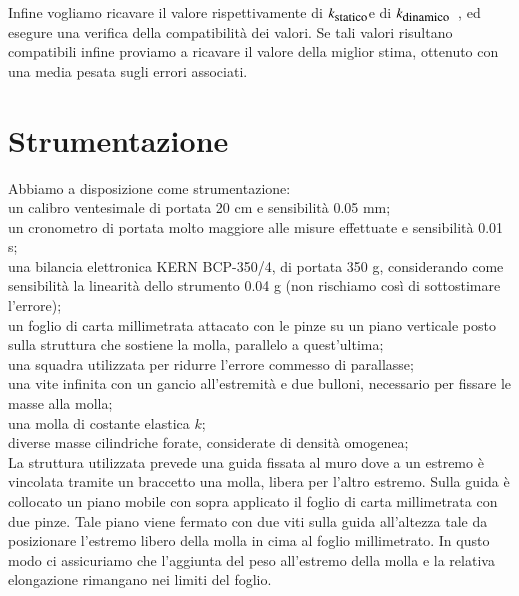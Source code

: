 \documentclass[italian, a4paper, 10pt, twocolumn]{../../style/lab_unige}
\newcommand{\ks}{$k_{\text{\small statico}}$\space}
\newcommand{\kd}{$k_{\text{\small dinamico}}$\space}
\begin{document}
    Infine vogliamo ricavare il valore rispettivamente di \ks e di \kd~, ed
    esegure una verifica della compatibilità dei valori. Se tali valori risultano compatibili infine proviamo a 
    ricavare il valore della miglior stima, ottenuto con una media pesata sugli errori associati.

    \section{Strumentazione}
    \label{section:strument}
    Abbiamo a disposizione come strumentazione:\\
    un calibro ventesimale di portata 20 cm e sensibilità 0.05 mm;\\
    un cronometro di portata molto maggiore alle misure effettuate e sensibilità 0.01 s;\\
    una bilancia elettronica KERN BCP-350/4, di portata 350 g, considerando come sensibilità la linearità dello 
    strumento 0.04 g (non rischiamo così di sottostimare l'errore);\\
    un foglio di carta millimetrata attacato con le pinze su un piano verticale posto sulla struttura che sostiene
    la molla, parallelo a quest'ultima;\\
    una squadra utilizzata per ridurre l'errore commesso di parallasse;\\
    una vite infinita con un gancio all'estremità e due bulloni, necessario per fissare le masse alla molla;\\
    una molla di costante elastica $k$;\\
    diverse masse cilindriche forate, considerate di densità omogenea;\\

    La struttura utilizzata prevede una guida fissata al muro dove a un estremo è vincolata tramite un braccetto 
    una molla, libera per l'altro estremo. Sulla guida è collocato un piano mobile con sopra applicato il foglio 
    di carta millimetrata con due pinze. Tale piano viene fermato con due viti sulla guida all'altezza tale da
    posizionare l'estremo libero della molla in cima al foglio millimetrato. In qusto modo ci assicuriamo che 
    l'aggiunta del peso all'estremo della molla e la relativa elongazione rimangano nei limiti del foglio.
\end{document}
